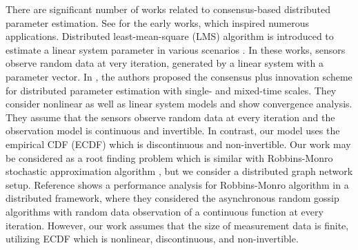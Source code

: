 \documentclass[journal]{IEEEtran}
\begin{document}


There are significant number of works related to consensus-based distributed parameter estimation. See \cite{Tsitsiklis1984,Tsitsiclis1986,Bertsekas1989,Yin1991} for the early works, which inspired numerous applications. Distributed least-mean-square (LMS) algorithm is introduced to estimate a linear system parameter in various scenarios \cite{Sayed2008,Sayed2013bookch,Giannakis2009,Stankovic2011,Lee2015}. In these works, sensors observe random data at very iteration, generated by a linear system with a parameter vector. In \cite{Kar2012}, the authors proposed the consensus plus innovation scheme for distributed parameter estimation with single- and mixed-time scales. They consider nonlinear as well as linear system models and show convergence analysis. They assume that the sensors observe random data at every iteration and the observation model is continuous and invertible. In contrast, our model uses the empirical CDF (ECDF) which is discontinuous and non-invertible. Our work may be considered as a root finding problem which is similar with Robbins-Monro stochastic approximation algorithm \cite{Robbins1951}, but we consider a distributed graph network setup. Reference \cite{Bianchi2013} shows a performance analysis for Robbins-Monro algorithm in a distributed framework, where they considered the asynchronous random gossip algorithms \cite{Boyd2006RGA} with random data observation of a continuous function at every iteration. However, our work assumes that the size of measurement data is finite, utilizing ECDF which is nonlinear, discontinuous, and non-invertible. 
\end{document}
